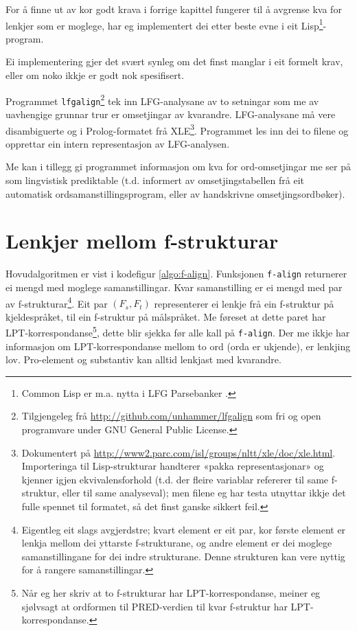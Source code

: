 \documentclass[11pt,a4paper,oneside,draft]{book}
\begin{document}
For å finne ut av kor godt krava i forrige kapittel fungerer til å
avgrense kva for lenkjer som er moglege, har eg implementert dei etter
beste evne i eit Lisp\footnote{Common Lisp er m.a. nytta i LFG Parsebanker
        \citep{rosen2009lpt}. }-program.

 Ei implementering gjer det svært synleg om det
finst manglar i eit formelt krav, eller om noko ikkje er godt nok
spesifisert.

Programmet \texttt{lfgalign}\footnote{Tilgjengeleg frå \href{http://github.com/unhammer/lfgalign}{http://github.com/unhammer/lfgalign} som fri og
       open programvare under GNU General Public License. } tek inn LFG-analysane av to
setningar som me av uavhengige grunnar trur er omsetjingar av
kvarandre. LFG-analysane må vere disambiguerte og i Prolog-formatet
frå XLE\footnote{Dokumentert på
       \href{http://www2.parc.com/isl/groups/nltt/xle/doc/xle.html}{http://www2.parc.com/isl/groups/nltt/xle/doc/xle.html}. Importeringa
       til Lisp-strukturar handterer «pakka representasjonar» og
       kjenner igjen ekvivalensforhold (t.d. der fleire variablar
       refererer til same f-struktur, eller til same analyseval); men
       filene eg har testa utnyttar ikkje det fulle spennet til
       formatet, så det finst ganske sikkert feil. }. Programmet les inn dei to filene og opprettar ein
intern representasjon av LFG-analysen.

Me kan i tillegg gi programmet informasjon om kva for ord-omsetjingar
me ser på som lingvistisk prediktable (t.d. informert av
omsetjingstabellen frå eit automatisk ordsamanstillingsprogram, eller
av handskrivne omsetjingsordbøker). 

\section{Lenkjer mellom f-strukturar}
\label{sec-4.1}


Hovudalgoritmen er vist i kodefigur \ref{algo:f-align}. Funksjonen
\texttt{f-align} returnerer ei mengd med moglege samanstillingar. Kvar
samanstilling er ei mengd med par av f-strukturar\footnote{Eigentleg eit slags avgjerdstre; kvart element er eit par, kor
        første element er lenkja mellom dei yttarste f-strukturane, og
        andre element er dei moglege samanstillingane for dei indre
        strukturane. Denne strukturen kan vere nyttig for å rangere
        samanstillingar. }. Eit par
$(F_s,F_t)$ representerer ei lenkje frå ein f-struktur på
kjeldespråket, til ein f-struktur på målspråket. Me føreset at dette
paret har LPT-korrespondanse\footnote{Når eg her skriv at to f-strukturar har LPT-korrespondanse,
        meiner eg sjølvsagt at ordformen til PRED-verdien til kvar
        f-struktur har LPT-korrespondanse. }, dette blir sjekka før alle kall
på \texttt{f-align}. Der me ikkje har informasjon om LPT-korrespondanse
mellom to ord (orda er ukjende), er lenkjing lov. Pro-element og
substantiv kan alltid lenkjast med kvarandre.
\end{document}
